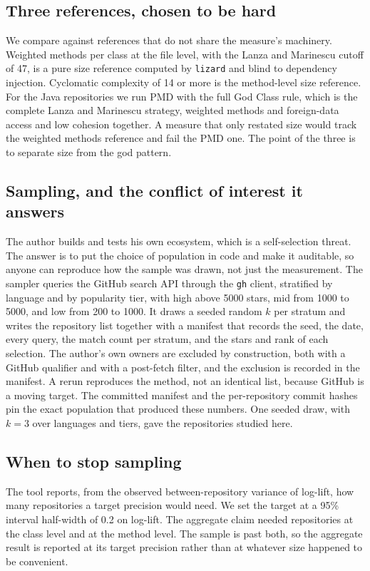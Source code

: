 \documentclass[11pt,a4paper]{article}
\begin{document}
\subsection{Three references, chosen to be hard}
We compare against references that do not share the measure's machinery. Weighted
methods per class at the file level, with the Lanza and Marinescu cutoff of 47, is
a pure size reference computed by \texttt{lizard} and blind to dependency
injection. Cyclomatic complexity of 14 or more is the method-level size reference.
For the Java repositories we run PMD with the full God Class rule, which is the
complete Lanza and Marinescu strategy, weighted methods and foreign-data access and
low cohesion together. A measure that only restated size would track the weighted
methods reference and fail the PMD one. The point of the three is to separate size
from the god pattern.

\subsection{Sampling, and the conflict of interest it answers}
The author builds and tests his own ecosystem, which is a self-selection threat. The
answer is to put the choice of population in code and make it auditable, so anyone
can reproduce how the sample was drawn, not just the measurement. The sampler
queries the GitHub search API through the \texttt{gh} client, stratified by
language and by popularity tier, with high above 5000 stars, mid from 1000 to 5000,
and low from 200 to 1000. It draws a seeded random $k$ per stratum and writes the
repository list together with a manifest that records the seed, the date, every
query, the match count per stratum, and the stars and rank of each selection. The
author's own owners are excluded by construction, both with a GitHub qualifier and
with a post-fetch filter, and the exclusion is recorded in the manifest. A rerun
reproduces the method, not an identical list, because GitHub is a moving target. The
committed manifest and the per-repository commit hashes pin the exact population
that produced these numbers. One seeded draw, with $k=3$ over \nLangs{} languages
and \nTiers{} tiers, gave the \nSampled{} repositories studied here.

\subsection{When to stop sampling}
The tool reports, from the observed between-repository variance of log-lift, how
many repositories a target precision would need. We set the target at a 95\%
interval half-width of 0.2 on log-lift. The aggregate claim needed \classNeed{}
repositories at the class level and \methodNeed{} at the method level. The sample
is past both, so the aggregate result is reported at its target precision rather
than at whatever size happened to be convenient.
\end{document}

